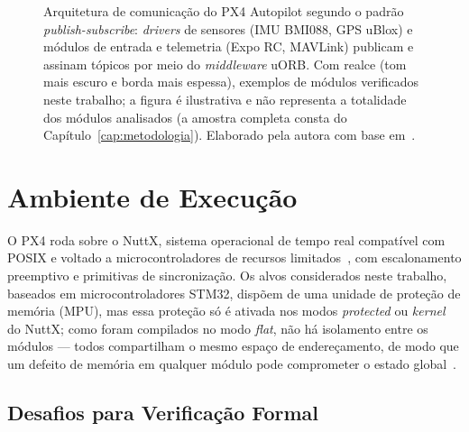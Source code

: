 \begin{figure}[ht]
{}
  \caption{Arquitetura de comunicação do PX4 Autopilot segundo o padrão
    \textit{publish-subscribe}: \textit{drivers} de sensores (IMU BMI088, GPS uBlox)
    e módulos de entrada e telemetria (Expo RC, MAVLink) publicam e assinam tópicos
    por meio do \textit{middleware} uORB. Com realce (tom mais escuro e borda mais
    espessa), exemplos de módulos verificados neste trabalho; a figura é
    ilustrativa e não representa a
    totalidade dos módulos analisados (a amostra completa consta do
    Capítulo~\ref{cap:metodologia}). Elaborado pela autora com base
    em~\cite{PX4_Documentation}.}
  \label{fig:px4_arquitetura}
\end{figure}

\section{Ambiente de Execução}
\label{sec:ambiente-execucao}

O PX4 roda sobre o NuttX, sistema operacional de tempo real compatível com POSIX
e voltado a microcontroladores de recursos limitados~\cite{NuttX}, com
escalonamento preemptivo e primitivas de sincronização. Os alvos considerados
neste trabalho, baseados em microcontroladores STM32, dispõem de uma unidade de
proteção de memória (MPU), mas essa proteção só é ativada nos modos
\textit{protected} ou \textit{kernel} do NuttX; como foram compilados no modo
\textit{flat}, não há isolamento entre os módulos --- todos compartilham o mesmo
espaço de endereçamento, de modo que um defeito de memória em qualquer módulo pode
comprometer o estado global~\cite{NuttX}.

\subsection{Desafios para Verificação Formal}

